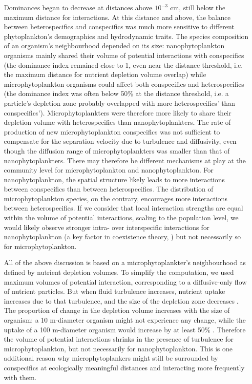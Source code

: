 \documentclass[english]{article}
\begin{document}
Dominances began to decrease at distances above $10^{-3}$ cm, still
below the maximum distance for interactions. At this distance and
above, the balance between heterospecifics and conspecifics was much
more sensitive to different phytoplankton's demographics and hydrodynamic
traits. The species composition of an organism's neighbourhood depended
on its size: nanophytoplankton organisms mainly shared their volume
of potential interactions with conspecifics (the dominance index remained
close to 1, even near the distance threshold, i.e. the maximum distance
for nutrient depletion volume overlap) while microphytoplankton organisms
could affect both conspecifics and heterospecifics (the dominance
index was often below 50\% at the distance threshold, i.e. a particle's
depletion zone probably overlapped with more heterospecifics' than
conspecifics'). Microphytoplankters were therefore more likely to
share their depletion volume with heterospecifics than nanophytoplankters.
The rate of production of new microphytoplankton conspecifics was
not sufficient to compensate for the separation velocity due to turbulence
and diffusivity, even though the diffusion range of microphytoplankters
was smaller than that of nanophytoplankters. There may therefore be
different mechanisms at play at the community level for microphytoplankton
and nanophytoplankton. For nanophytoplankton, the spatial structure
likely leads to more interactions between conspecifics than between
heterospecifics. The distribution of microphytoplankton species, on
the contrary, encourages more interactions between heterospecifics.
If we consider that local interaction strengths are equal within the
volume of potential interactions, scaling to the population level,
we would likely observe stronger intra- over interspecific interactions
for nanophytoplankton (a key factor in coexistence theory, \citealp{barabas_self-regulation_2017})
but not necessarily so for microphytoplankton.

All of the above discussion is based on a microphytoplankter's neighbourhood
as defined by nutrient depletion volumes. To simplify the computation,
we used maximum volumes of potential interaction, corresponding to
a diffusive-only flow of nutrient particles. But when fluid turbulence
increases, nutrient uptake increases due to that turbulence, and the
size of the depletion zone decreases \citep{karp-boss_nutrient_1996}.
The proportion of change in the depletion volume increases with the
size of organism: a 10 \textmu m-diameter organism might not experience
any change, while the uptake of a 100 \textmu m-diameter organism
would increase by at least 50\% \citep{karp-boss_nutrient_1996}.
Therefore the volume of potential interactions shrinks in the presence
of turbulence for microphytoplankton, but not necessarily for nanophytoplankton.
This is one additional reason why microphytoplankers might still be
surrounded by conspecifics at ecologically meaningful distances and
interacting more frequently with them.
\end{document}
